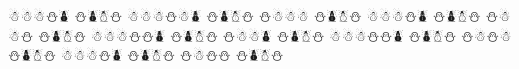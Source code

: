 \documentclass{article}
\begin{document}
\begin{whitesnowman}
☃☃☃⛄⛇ %
⛄⛇☃⛄
☃☃☃⛄☃⛇ %
⛄⛇☃⛄
⛄☃☃☃ %
⛄⛇☃⛄
☃☃☃⛄⛇ %
⛄⛇☃⛄
⛄☃☃⛄ %
⛄⛇☃⛄
☃☃☃⛄⛄⛇ %
⛄⛇☃⛄
⛄☃☃⛇ %
⛄⛇☃⛄
☃☃☃⛄⛄⛇ %
⛄⛇☃⛄
⛄☃⛄☃ %
⛄⛇☃⛄
☃☃☃⛄⛇ %
⛄⛇☃⛄
⛄☃⛄⛄ %
⛄⛇☃⛄
\end{whitesnowman}
\end{document}
